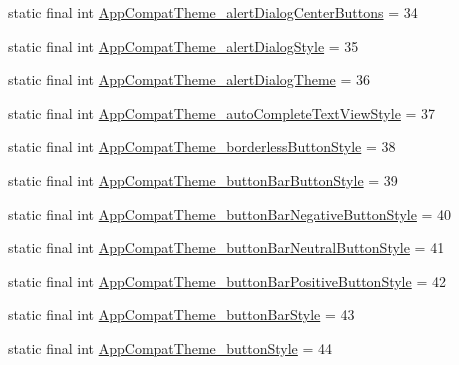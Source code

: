 \begin{DoxyCompactItemize}
\item 
static final int \mbox{\hyperlink{classandroid_1_1support_1_1v7_1_1appcompat_1_1_r_1_1styleable_a41f73f52e5c3055537001bb7e9997a19}{App\+Compat\+Theme\+\_\+alert\+Dialog\+Center\+Buttons}} = 34
\item 
static final int \mbox{\hyperlink{classandroid_1_1support_1_1v7_1_1appcompat_1_1_r_1_1styleable_aedae223963c5754df19376e4cbd784a4}{App\+Compat\+Theme\+\_\+alert\+Dialog\+Style}} = 35
\item 
static final int \mbox{\hyperlink{classandroid_1_1support_1_1v7_1_1appcompat_1_1_r_1_1styleable_a63dc331a581ba52aec6c2890516293a6}{App\+Compat\+Theme\+\_\+alert\+Dialog\+Theme}} = 36
\item 
static final int \mbox{\hyperlink{classandroid_1_1support_1_1v7_1_1appcompat_1_1_r_1_1styleable_a9f832986176aa6626d5dce08e22d67e4}{App\+Compat\+Theme\+\_\+auto\+Complete\+Text\+View\+Style}} = 37
\item 
static final int \mbox{\hyperlink{classandroid_1_1support_1_1v7_1_1appcompat_1_1_r_1_1styleable_ace984cb089e440a80c706fc351c5d324}{App\+Compat\+Theme\+\_\+borderless\+Button\+Style}} = 38
\item 
static final int \mbox{\hyperlink{classandroid_1_1support_1_1v7_1_1appcompat_1_1_r_1_1styleable_a77e14c94700b385fd4d168421e983029}{App\+Compat\+Theme\+\_\+button\+Bar\+Button\+Style}} = 39
\item 
static final int \mbox{\hyperlink{classandroid_1_1support_1_1v7_1_1appcompat_1_1_r_1_1styleable_a94fab9eb762c4c2d5da18626cbf769e0}{App\+Compat\+Theme\+\_\+button\+Bar\+Negative\+Button\+Style}} = 40
\item 
static final int \mbox{\hyperlink{classandroid_1_1support_1_1v7_1_1appcompat_1_1_r_1_1styleable_ac6647a1aabeca99125041267988a52a3}{App\+Compat\+Theme\+\_\+button\+Bar\+Neutral\+Button\+Style}} = 41
\item 
static final int \mbox{\hyperlink{classandroid_1_1support_1_1v7_1_1appcompat_1_1_r_1_1styleable_a8edc5d3b0d5adab1b0cf94fe2dc2bfdc}{App\+Compat\+Theme\+\_\+button\+Bar\+Positive\+Button\+Style}} = 42
\item 
static final int \mbox{\hyperlink{classandroid_1_1support_1_1v7_1_1appcompat_1_1_r_1_1styleable_a9ffc785733597a5af41aae74056d6e24}{App\+Compat\+Theme\+\_\+button\+Bar\+Style}} = 43
\item 
static final int \mbox{\hyperlink{classandroid_1_1support_1_1v7_1_1appcompat_1_1_r_1_1styleable_a4874e1217a8edb3ddeba23bbab028d29}{App\+Compat\+Theme\+\_\+button\+Style}} = 44

\end{DoxyCompactItemize}
